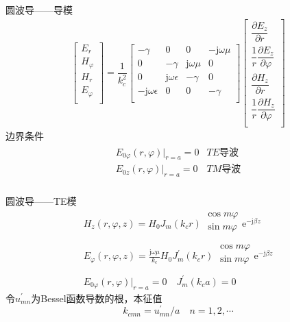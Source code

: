 \begin{frame}{圆波导——导模}
    \begin{gather*}
        \begin{bmatrix*}
            E_r\\
            H_{\varphi}\\
            H_r\\
            E_{\varphi}\\
        \end{bmatrix*}
        =\dfrac{1}{k_c^2}
        \begin{bmatrix*}
            -\gamma & 0 & 0 & -\mathrm{j}\omega\mu \\
            0 & -\gamma & \mathrm{j}\omega\mu & 0 \\
            0 & \mathrm{j}\omega\epsilon & -\gamma & 0 \\
            -\mathrm{j}\omega\epsilon & 0 & 0 & -\gamma \\
        \end{bmatrix*}
        \begin{bmatrix*}
            \dfrac{\partial E_z}{\partial r} \\
            \dfrac{1}{r}\dfrac{\partial E_z}{\partial\varphi}\\
            \dfrac{\partial H_z}{\partial r}\\
            \dfrac{1}{r}\dfrac{\partial H_z}{\partial\varphi}\\
        \end{bmatrix*}
    \end{gather*}
    边界条件
    \begin{gather*}
        \begin{matrix*}
            E_{0\varphi}(r,\varphi)|_{r=a}=0 & TE导波 \\
            E_{0z}(r,\varphi)|_{r=a}=0 & TM导波 \\
        \end{matrix*}
    \end{gather*}
\end{frame}

\begin{frame}{圆波导——TE模}
    \begin{gather*}
        H_z(r,\varphi,z)=H_0J_m(k_cr)
        \begin{matrix*}
            \cos m\varphi \\
            \sin m\varphi \\
        \end{matrix*}
        \mathrm{e}^{-\mathrm{j}\beta z}\\
        E_{\varphi}(r,\varphi,z)=\frac{\mathrm{j}\omega\mu}{k_c}H_0J_m^{'}(k_cr)
        \begin{matrix*}
            \cos m\varphi \\
            \sin m\varphi \\
        \end{matrix*}
        \mathrm{e}^{-\mathrm{j}\beta z}\\
        E_{0\varphi}(r,\varphi)|_{r=a}=0 \quad J_m^{'}(k_c a)=0
    \end{gather*}
    令$u_{mn}^{'}$为Bessel函数导数的根，本征值
    $$k_{cmn}=u_{mn}^{'}/a \quad n=1,2,\cdots$$
\end{frame}

